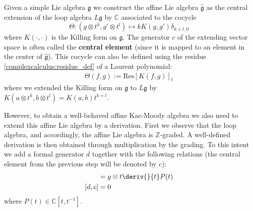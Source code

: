     \begin{construct}
        Given a simple Lie algebra $\mathfrak{g}$ we construct the affine Lie algebra $\widehat{\mathfrak{g}}$ as the central extension of the loop algebra $L\mathfrak{g}$ by $\mathbb{C}$ associated to the cocycle \[\Theta:(g\otimes t^k,g'\otimes t^l)\mapsto kK(g,g')\delta_{k+l,0}\] where $K(\cdot,\cdot)$ is the Killing form on $\mathfrak{g}$. The generator $c$ of the extending vector space is often called the \textbf{central element} (since it is mapped to an element in the center of $\widehat{\mathfrak{g}}$). This cocycle can also be defined using the residue \ref{complexcalculus:residue_def} of a Laurent polynomial:
        \begin{gather}
            \Theta(f,g) := \text{Res}\left[K(f,g)\right]_t
        \end{gather}
        where we extended the Killing form on $\mathfrak{g}$ to $L\mathfrak{g}$ by $K(a\otimes t^k,b\otimes t^l)=K(a,b)t^{k+l}$.

        However, to obtain a well-behaved affine Kac-Moody algebra we also need to extend this affine Lie algebra by a derivation. First we observe that the loop algebra, and accordingly, the affine Lie algebra is $\mathbb{Z}$-graded. A well-defined derivation is then obtained through multiplication by the grading. To this intent we add a formal generator $d$ together with the following relations (the central element from the previous step will be denoted by $c$):
        \begin{align}
            [d,g\otimes P(t)] &= g\otimes t\deriv{}{t}P(t)\\
            [d,c] &= 0
        \end{align}
        where $P(t)\in\mathbb{C}[t,t^{-1}]$.
    \end{construct}

